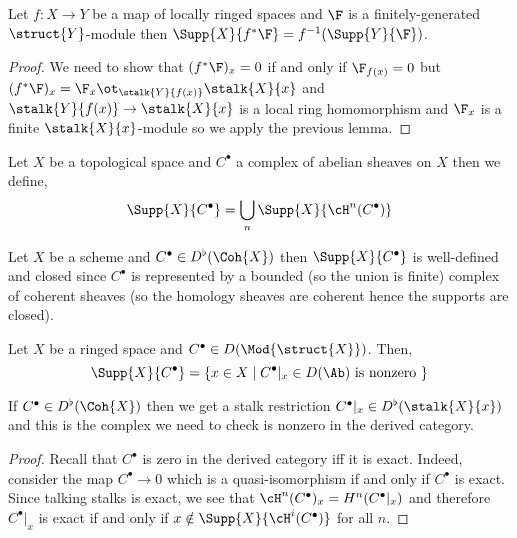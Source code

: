 \documentclass[12pt]{article}
\begin{document}
\begin{prop}
Let $f : X \to Y$ be a map of locally ringed spaces and $\F$ is a finitely-generated $\struct{Y}$-module then $\Supp{X}{f^* \F} = f^{-1}(\Supp{Y}{\F})$.
\end{prop}

\begin{proof}
We need to show that $(f^* \F)_x = 0$ if and only if $\F_{f(x)} = 0$ but $(f^* \F)_x = \F_x \ot_{\stalk{Y}{f(x)}} \stalk{X}{x}$ and $\stalk{Y}{f(x)} \to \stalk{X}{x}$ is a local ring homomorphism and $\F_x$ is a finite $\stalk{X}{x}$-module so we apply the previous lemma.
\end{proof}

\begin{defn}
Let $X$ be a topological space and $C^\bullet$ a complex of abelian sheaves on $X$ then we define,
\[ \Supp{X}{C^\bullet} = \bigcup_n \Supp{X}{\cH^n(C^\bullet)} \]
\end{defn}

\begin{rmk}
Let $X$ be a scheme and $C^\bullet \in D^\flat(\Coh{X})$ then $\Supp{X}{C^\bullet}$ is well-defined and closed since $C^\bullet$ is represented by a bounded (so the union is finite) complex of coherent sheaves (so the homology sheaves are coherent hence the supports are closed).
\end{rmk}

\begin{prop}
Let $X$ be a ringed space and $C^\bullet \in D(\Mod{\struct{X}})$. Then,
\[ \Supp{X}{C^\bullet} = \{ x \in X \mid C^\bullet|_x \in D(\Ab) \text{ is nonzero } \} \]
\end{prop}

\begin{rmk}
If $C^\bullet \in D^\flat(\Coh{X})$ then we get a stalk restriction $C^\bullet|_x \in D^\flat(\stalk{X}{x})$ and this is the complex we need to check is nonzero in the derived category.
\end{rmk}

\begin{proof}
Recall that $C^\bullet$ is zero in the derived category iff it is exact. Indeed, consider the map $C^\bullet \to 0$ which is a quasi-isomorphism if and only if $C^\bullet$ is exact. Since talking stalks is exact, we see that $\cH^n(C^\bullet)_x = H^n(C^\bullet|_x)$ and therefore $C^\bullet|_x$ is exact if and only if $x \notin \Supp{X}{\cH^i(C^\bullet)}$ for all $n$.
\end{proof}
\end{document}
